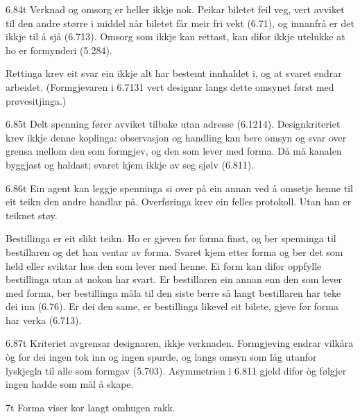 \begin{formproposition}{6.84}{t}
Verknad og omsorg er heller ikkje nok. Peikar biletet feil veg, vert avviket til den andre større i middel når biletet får meir fri vekt (6.71), og innanfrå er det ikkje til å sjå (6.713). Omsorg som ikkje kan rettast, kan difor ikkje utelukke at ho er formynderi (5.284).

Rettinga krev eit svar ein ikkje alt har bestemt innhaldet i, og at svaret endrar arbeidet. (Formgjevaren i 6.7131 vert designar langs dette omsynet først med prøvesitjinga.)
\end{formproposition}

\begin{formproposition}{6.85}{t}
Delt spenning fører avviket tilbake utan adresse (6.1214). Designkriteriet krev ikkje denne koplinga: observasjon og handling kan bere omsyn og svar over grensa mellom den som formgjev, og den som lever med forma. Då må kanalen byggjast og haldast; svaret kjem ikkje av seg sjølv (6.811).
\end{formproposition}

\begin{formproposition}{6.86}{t}
Ein agent kan leggje spenninga si over på ein annan ved å omsetje henne til eit teikn den andre handlar på. Overføringa krev ein felles protokoll. Utan han er teiknet støy.

Bestillinga er eit slikt teikn. Ho er gjeven før forma finst, og ber spenninga til bestillaren og det han ventar av forma. Svaret kjem etter forma og ber det som held eller sviktar hos den som lever med henne. Ei form kan difor oppfylle bestillinga utan at nokon har svart. Er bestillaren ein annan enn den som lever med forma, ber bestillinga måla til den siste berre så langt bestillaren har teke dei inn (6.76). Er dei den same, er bestillinga likevel eit bilete, gjeve før forma har verka (6.713).
\end{formproposition}

\begin{formproposition}{6.87}{t}
Kriteriet avgrensar designaren, ikkje verknaden. Formgjeving endrar vilkåra òg for dei ingen tok inn og ingen spurde, og langs omsyn som låg utanfor lyskjegla til alle som formgav (5.703). Asymmetrien i 6.811 gjeld difor òg følgjer ingen hadde som mål å skape.
\end{formproposition}

\begin{formproposition}{7}{t}
Forma viser kor langt omhugen rakk.
\end{formproposition}

